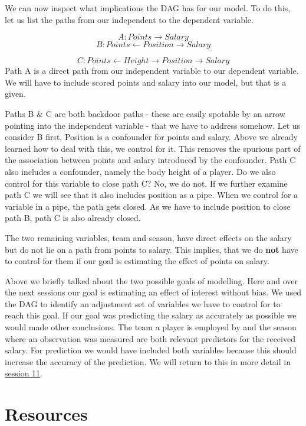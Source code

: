 \documentclass[
]{book}
\begin{document}
We can now inspect what implications the DAG has for our model. To do
this, let us list the paths from our independent to the dependent
variable.

\[A: Points \rightarrow Salary\]
\[B: Points \leftarrow Position \rightarrow Salary\]

\[C: Points \leftarrow Height \rightarrow Position \rightarrow Salary\]
Path A is a direct path from our independent variable to our dependent
variable. We will have to include scored points and salary into our
model, but that is a given.

Paths B \& C are both backdoor paths - these are easily spotable by an
arrow pointing into the independent variable - that we have to address
somehow. Let us consider B first. Position is a confounder for points
and salary. Above we already learned how to deal with this, we control
for it. This removes the spurious part of the association between points
and salary introduced by the confounder. Path C also includes a
confounder, namely the body height of a player. Do we also control for
this variable to close path C? No, we do not. If we further examine path
C we will see that it also includes position as a pipe. When we control
for a variable in a pipe, the path gets closed. As we have to include
position to close path B, path C is also already closed.

The two remaining variables, team and season, have direct effects on the
salary but do not lie on a path from points to salary. This implies,
that we do \textbf{not} have to control for them if our goal is estimating
the effect of points on salary.

Above we briefly talked about the two possible goals of modelling. Here
and over the next sessions our goal is estimating an effect of interest
without bias. We used the DAG to identify an adjustment set of variables
we have to control for to reach this goal. If our goal was predicting
the salary as accurately as possible we would made other conclusions.
The team a player is employed by and the season where an observation was
measured are both relevant predictors for the received salary. For
prediction we would have included both variables because this should
increase the accuracy of the prediction. We will return to this in more
detail in \protect\hyperlink{pm-t}{session 11}.

\hypertarget{resources}{%
\section{Resources}\label{resources}}
\end{document}
